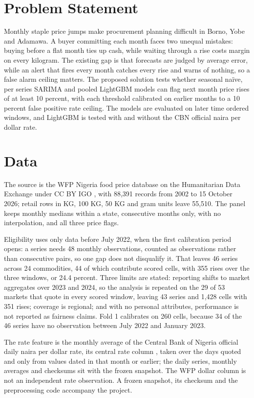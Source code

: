 \documentclass[11pt,a4paper]{article}
\begin{document}
\section{Problem Statement}\label{sec:problem}

Monthly staple price jumps make procurement planning difficult in Borno, Yobe and Adamawa. A buyer committing each month faces two unequal mistakes: buying before a flat month ties up cash, while waiting through a rise costs margin on every kilogram. The existing gap is that forecasts are judged by average error, while an alert that fires every month catches every rise and warns of nothing, so a false alarm ceiling matters. The proposed solution tests whether seasonal na\"ive, per series SARIMA and pooled LightGBM models can flag next month price rises of at least 10 percent, with each threshold calibrated on earlier months to a 10 percent false positive rate ceiling. The models are evaluated on later time ordered windows, and LightGBM is tested with and without the CBN official naira per dollar rate.

\section{Data}\label{sec:data}

The source is the WFP Nigeria food price database on the Humanitarian Data Exchange under CC BY IGO \cite{wfp2026nigeria}, with 88{,}391 records from 2002 to 15 October 2026; retail rows in KG, 100 KG, 50 KG and gram units leave 55{,}510. The panel keeps monthly medians within a state, consecutive months only, with no interpolation, and all three price flags.

Eligibility uses only data before July 2022, when the first calibration period opens: a series needs 48 monthly observations, counted as observations rather than consecutive pairs, so one gap does not disqualify it. That leaves 46 series across 24 commodities, 44 of which contribute scored cells, with 355 rises over the three windows, or 24.4 percent. Three limits are stated: reporting shifts to market aggregates over 2023 and 2024, so the analysis is repeated on the 29 of 53 markets that quote in every scored window, leaving 43 series and 1{,}428 cells with 351 rises; coverage is regional; and with no personal attributes, performance is not reported as fairness claims. Fold 1 calibrates on 260 cells, because 34 of the 46 series have no observation between July 2022 and January 2023.

The rate feature is the monthly average of the Central Bank of Nigeria official daily naira per dollar rate, its central rate column \cite{cbn2026rates}, taken over the days quoted and only from values dated in that month or earlier; the daily series, monthly averages and checksums sit with the frozen snapshot. The WFP dollar column is not an independent rate observation. A frozen snapshot, its checksum and the preprocessing code accompany the project.
\end{document}
